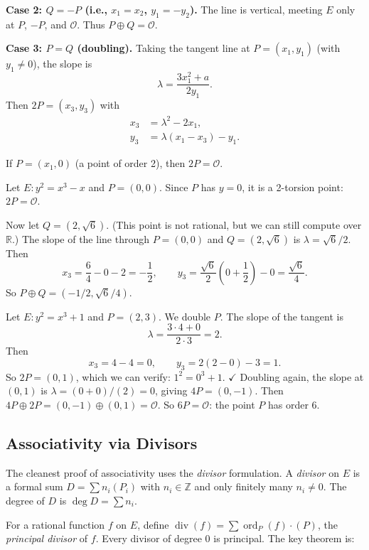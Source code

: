\textbf{Case 2: $Q = -P$ (i.e., $x_1 = x_2$, $y_1 = -y_2$).}
The line is vertical, meeting $E$ only at $P$, $-P$, and $\mathcal{O}$. Thus $P \oplus Q = \mathcal{O}$.

\textbf{Case 3: $P = Q$ (doubling).}
Taking the tangent line at $P = (x_1, y_1)$ (with $y_1 \neq 0$), the slope is
\[
\lambda = \frac{3x_1^2 + a}{2y_1}.
\]
Then $2P = (x_3, y_3)$ with
\begin{align}
x_3 &= \lambda^2 - 2x_1, \label{eq:x3-double} \\
y_3 &= \lambda(x_1 - x_3) - y_1. \label{eq:y3-double}
\end{align}

If $P = (x_1, 0)$ (a point of order 2), then $2P = \mathcal{O}$.

\begin{example}
Let $E: y^2 = x^3 - x$ and $P = (0, 0)$. Since $P$ has $y = 0$, it is a 2-torsion point: $2P = \mathcal{O}$.

Now let $Q = (2, \sqrt{6})$. (This point is not rational, but we can still compute over $\mathbb{R}$.) The slope of the line through $P = (0,0)$ and $Q = (2, \sqrt{6})$ is $\lambda = \sqrt{6}/2$. Then
\[
x_3 = \frac{6}{4} - 0 - 2 = -\frac{1}{2}, \qquad y_3 = \frac{\sqrt{6}}{2}\left(0 + \frac{1}{2}\right) - 0 = \frac{\sqrt{6}}{4}.
\]
So $P \oplus Q = (-1/2, \sqrt{6}/4)$.
\end{example}

\begin{example}
Let $E: y^2 = x^3 + 1$ and $P = (2, 3)$. We double $P$. The slope of the tangent is
\[
\lambda = \frac{3 \cdot 4 + 0}{2 \cdot 3} = 2.
\]
Then
\[
x_3 = 4 - 4 = 0, \qquad y_3 = 2(2 - 0) - 3 = 1.
\]
So $2P = (0, 1)$, which we can verify: $1^2 = 0^3 + 1$. $\checkmark$ Doubling again, the slope at $(0,1)$ is $\lambda = (0 + 0)/(2) = 0$, giving $4P = (0, -1)$. Then $4P \oplus 2P = (0, -1) \oplus (0, 1) = \mathcal{O}$. So $6P = \mathcal{O}$: the point $P$ has order 6.
\end{example}

\subsection{Associativity via Divisors}

The cleanest proof of associativity uses the \emph{divisor} formulation. A \emph{divisor} on $E$ is a formal sum $D = \sum n_i (P_i)$ with $n_i \in \mathbb{Z}$ and only finitely many $n_i \neq 0$. The degree of $D$ is $\deg D = \sum n_i$.

For a rational function $f$ on $E$, define $\operatorname{div}(f) = \sum \operatorname{ord}_P(f) \cdot (P)$, the \emph{principal divisor} of $f$. Every divisor of degree 0 is principal. The key theorem is:

